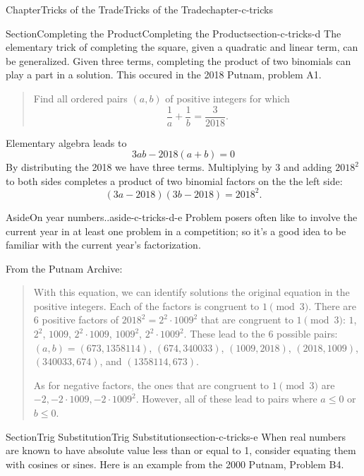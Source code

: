 \documentclass[oneside,10pt,]{book}
\numberwithin{equation}{section}
\begin{document}
\begin{chapterptx}{Chapter}{Tricks of the Trade}{}{Tricks of the Trade}{}{}{chapter-c-tricks}
\begin{sectionptx}{Section}{Completing the Product}{}{Completing the Product}{}{}{section-c-tricks-d}
The elementary trick of completing the square, given a quadratic and linear term, can be generalized.  Given three terms, completing the product of two binomials can play a part in a solution.  This occured in the 2018 Putnam, problem A1.%
\begin{quote}%
Find all ordered pairs \((a,b)\) of positive integers for which%
\begin{equation*}
\frac{1}{a} + \frac{1}{b} = \frac{3}{2018}.
\end{equation*}
%
\end{quote}
Elementary algebra leads to%
\begin{equation*}
3ab-2018(a+b)=0
\end{equation*}
By distributing the 2018 we have three terms.  Multiplying by 3 and adding \(2018^2\) to both sides completes a product of two binomial factors on the the left side:%
\begin{equation*}
(3a-2018)(3b-2018) = 2018^2.
\end{equation*}
%
\begin{aside}{Aside}{On year numbers..}{aside-c-tricks-d-e}%
Problem posers often like to involve the current year in at least one problem in a competition; so it's a good idea to be familiar with the current year's factorization.%
\end{aside}
From the Putnam Archive:%
\begin{quote}%
With this equation, we can identify solutions the original equation in the positive integers. Each of the factors is congruent to \(1 \pmod 3\). There are \(6\) positive factors of \(2018^2 = 2^2 \cdot 1009^2\) that are congruent to \(1 \pmod 3\): \(1\), \(2^2\), \(1009\), \(2^2 \cdot 1009\), \(1009^2\), \(2^2 \cdot 1009^2\). These lead to the \(6\) possible pairs: \((a,b) = (673,1358114)\), \((674,340033)\), \((1009,2018)\), \((2018,1009)\), \((340033,674)\), and \((1358114,673)\).%
\par
As for negative factors, the ones that are congruent to \(1 \pmod 3\) are \(-2, -2 \cdot 1009, -2 \cdot 1009^2\).  However, all of these lead to pairs where \(a \leq 0\) or \(b \leq 0\).%
\end{quote}
\end{sectionptx}
%
%
\typeout{************************************************}
\typeout{************************************************}
%
\begin{sectionptx}{Section}{Trig Substitution}{}{Trig Substitution}{}{}{section-c-tricks-e}
When real numbers are known to have absolute value less than or equal to 1, consider equating them with cosines or sines.   Here is an example from the 2000 Putnam, Problem B4.%

\end{sectionptx}
\end{chapterptx}
\end{document}
